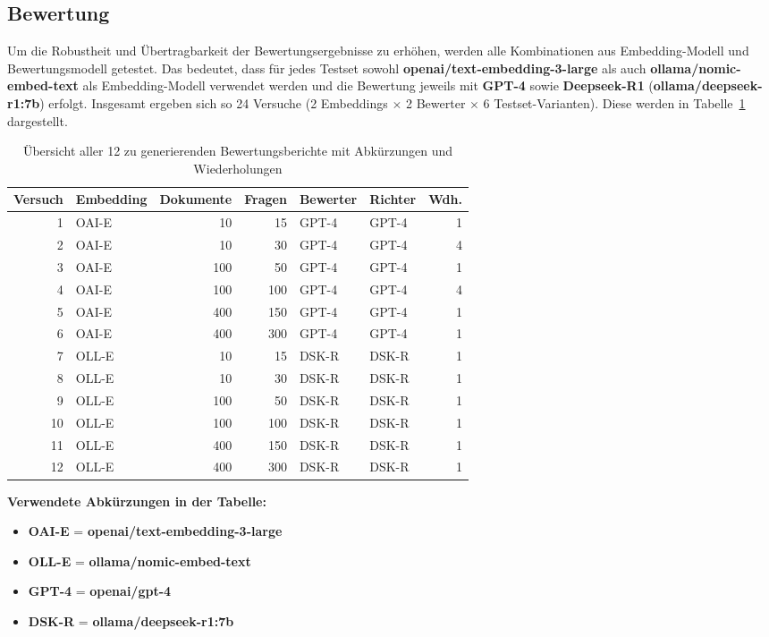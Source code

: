 \subsection{Bewertung}
\label{sec:bewertung}
Um die Robustheit und Übertragbarkeit der Bewertungsergebnisse zu erhöhen, werden alle Kombinationen aus Embedding-Modell und Bewertungsmodell getestet. Das bedeutet, dass für jedes Testset sowohl \textbf{openai/text-embedding-3-large} als auch \textbf{ollama/nomic-embed-text} als Embedding-Modell verwendet werden und die Bewertung jeweils mit \textbf{GPT-4} sowie \textbf{Deepseek-R1} (\textbf{ollama/deepseek-r1:7b}) erfolgt. Insgesamt ergeben sich so 24 Versuche (2 Embeddings $\times$ 2 Bewerter $\times$ 6 Testset-Varianten).
Diese werden in Tabelle~\ref{tab:bewertungsberichte} dargestellt.
\begin{table}[htbp]
    \centering
    \caption[Übersicht der Versuche]{Übersicht aller 12 zu generierenden Bewertungsberichte mit Abkürzungen und Wiederholungen}
    \begin{tabular}{|r|l|r|r|l|l|r|}
        \hline
        \textbf{Versuch} & \textbf{Embedding} & \textbf{Dokumente} & \textbf{Fragen} & \textbf{Bewerter} & \textbf{Richter} & \textbf{Wdh.} \\
        \hline
        1  & OAI-E & 10   & 15  & GPT-4 & GPT-4 & 1 \\
        2  & OAI-E & 10   & 30  & GPT-4 & GPT-4 & 4 \\
        3  & OAI-E & 100  & 50  & GPT-4 & GPT-4 & 1 \\
        4  & OAI-E & 100  & 100 & GPT-4 & GPT-4 & 4 \\
        5  & OAI-E & 400 & 150 & GPT-4 & GPT-4 & 1 \\
        6  & OAI-E & 400 & 300 & GPT-4 & GPT-4 & 1 \\
        \hline
        7  & OLL-E & 10   & 15  & DSK-R & DSK-R & 1 \\
        8  & OLL-E & 10   & 30  & DSK-R & DSK-R & 1 \\
        9  & OLL-E & 100  & 50  & DSK-R & DSK-R & 1 \\
        10 & OLL-E & 100  & 100 & DSK-R & DSK-R & 1 \\
        11 & OLL-E & 400 & 150 & DSK-R & DSK-R & 1 \\
        12 & OLL-E & 400 & 300 & DSK-R & DSK-R & 1 \\
        \hline
    \end{tabular}
    \label{tab:bewertungsberichte}
\end{table}

\noindent
\textbf{Verwendete Abkürzungen in der Tabelle:}
\begin{itemize}
    \item \textbf{OAI-E} = \textbf{openai/text-embedding-3-large}
    \item \textbf{OLL-E} = \textbf{ollama/nomic-embed-text}
    \item \textbf{GPT-4} = \textbf{openai/gpt-4}
    \item \textbf{DSK-R} = \textbf{ollama/deepseek-r1:7b}
\end{itemize}